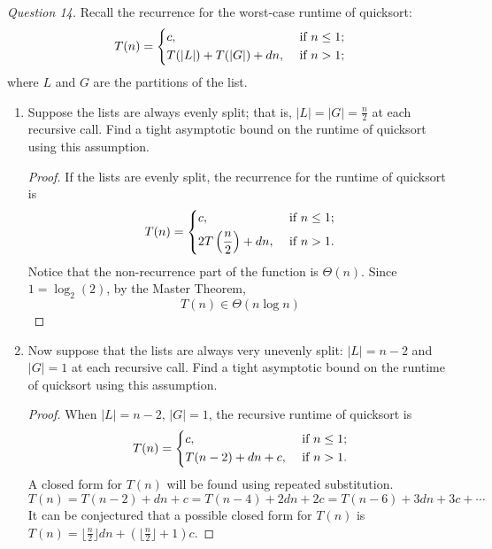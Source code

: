 \documentclass[11pt]{article}
\begin{document}
    \textit{Question 14.} Recall the recurrence for the worst-case runtime of quicksort:
    \[
        T(n)=\begin{dcases}
            c, &\text{ if } n\leq 1;\\
            T(|L|)+T(|G|) + dn, &\text{ if } n>1;\\
        \end{dcases}
    \]
    where \(L\) and \(G\) are the partitions of the list.
    \begin{enumerate}
        \item Suppose the lists are always evenly split; that is, \(|L| = |G| = \frac{n}{2}\) at each recursive call. Find a tight asymptotic bound on the runtime of quicksort using this assumption.
        
        \begin{proof}
            If the lists are evenly split, the recurrence for the runtime of quicksort is
            \[
                T(n)=\begin{dcases}
                    c, &\text{ if } n \leq 1 ;\\
                    2T\left(\frac{n}{2}\right) + dn, &\text{ if } n >1 .
                \end{dcases}
            \]
            Notice that the non-recurrence part of the function is \(\Theta (n)\). Since \(1 = \log _2(2)\), by the Master Theorem,
            \[
                T(n) \in \Theta(n\log n)
            \]
        \end{proof}
        \item Now suppose that the lists are always very unevenly split: \(|L| = n-2\) and \(|G| = 1\) at each recursive call. Find a tight asymptotic bound on the runtime of quicksort using this assumption.
        
        \begin{proof}
            When \(|L| = n-2\), \(|G| =1\), the recursive runtime of quicksort is
            \[
                T(n)= \begin{dcases}
                    c, &\text{ if } n \leq 1 ;\\
                    T(n-2) + dn + c, &\text{ if } n > 1 .
                \end{dcases}
            \]
            A closed form for \(T(n)\) will be found using repeated substitution.
            \[
                T(n) = T(n-2) + dn + c = T(n-4) + 2dn + 2c = T(n-6) + 3dn + 3c + \cdots
            \]
            It can be conjectured that a possible closed form for \(T(n)\) is \(T(n) = \lfloor \frac{n}{2} \rfloor dn + \left( \lfloor \frac{n}{2} \rfloor + 1 \right) c\).


\end{proof}
\end{enumerate}
\end{document}
